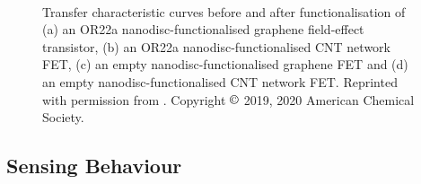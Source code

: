 \documentclass[
  a4paper,
]{scrbook}
\begin{document}
\begin{figure}
\begin{minipage}[t]{0.01\linewidth}
{\centering 

~

}

\end{minipage}%

\caption[Transfer characteristic curves of graphene and carbon nanotube
network field-effect transistors before and after either OR22a or empty
nanodisc
functionalisation.]{\label{fig-functionalisation-literature}Transfer
characteristic curves before and after functionalisation of (a) an OR22a
nanodisc-functionalised graphene field-effect transistor, (b) an OR22a
nanodisc-functionalised CNT network FET, (c) an empty
nanodisc-functionalised graphene FET and (d) an empty
nanodisc-functionalised CNT network FET. Reprinted with permission from
\autocite{Murugathas2019a,Murugathas2020}. Copyright \(\copyright\)
2019, 2020 American Chemical Society.}

\end{figure}

\hypertarget{sensing-behaviour-1}{%
\subsection{Sensing Behaviour}\label{sensing-behaviour-1}}
\end{document}
